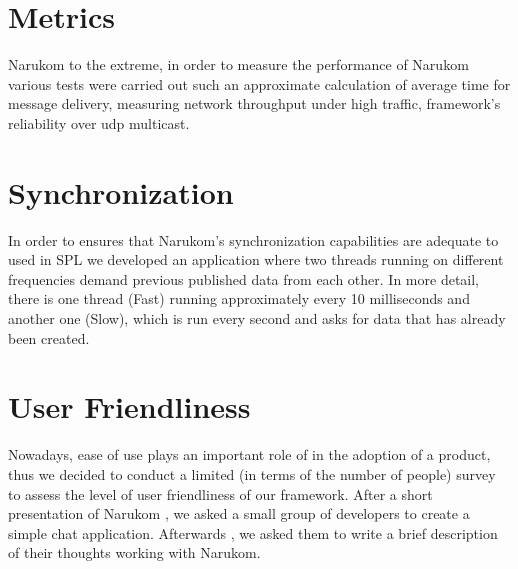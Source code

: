 \section{Metrics}
Narukom to the extreme, in order to measure the performance of Narukom various tests were carried out such an approximate calculation of average time for message delivery, measuring network throughput under high traffic, framework's reliability over udp multicast. 

\section{Synchronization}
In order to ensures that Narukom's synchronization capabilities are adequate to used in SPL we developed an application where two threads running on different frequencies demand previous published data from each other. In more detail, there is one  thread (Fast) running approximately every 10 milliseconds and another one (Slow), which is run every second and asks for data that has already been created.

\section{User Friendliness}
Nowadays, ease of use plays an important role of in the adoption of a product, thus we decided to conduct a limited  (in terms of the number of people) survey to assess the level of user friendliness of our framework. After a short presentation of Narukom , we asked a small group of developers to create a simple chat application. Afterwards , we asked them to write a brief description of their thoughts working with Narukom.

